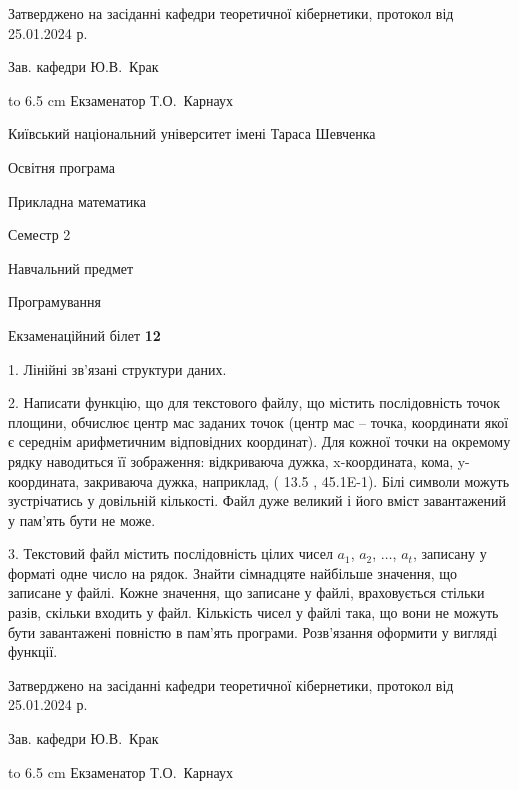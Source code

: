 \documentclass[12pt, ukrainian]{article}
\begin{document}
{\smallskip\smallskip \begin {scriptsize} Затверджено на засіданні кафедри теоретичної кібернетики, протокол   від   25.01.2024 р.\par\smallskip\smallskip\smallskip\smallskip
{\parbox {6.5 cm} {Зав. кафедри \dotfill Ю.В.~Крак}}\hspace {0.7cm} {\hbox to 6.5 cm { Екзаменатор \dotfill Т.О.~Карнаух}} \end{scriptsize}}
\vspace{0.9cm}
{{\begin {scriptsize}\par
{ \center  Київський національний університет імені Тараса Шевченка \par}
{\parbox {5 cm}{Освітня програма \hfill}{\parbox {7 cm}{Прикладна математика\hfill}}\parbox {6 cm}{\hfill Семестр 2}}\par
{\parbox {5 cm} {Навчальний предмет \hfill}\parbox {7 cm}{Програмування \hfill}\parbox {6cm}{\hfill}\par}\vspace{-15pt} \end{scriptsize}}{\center Екзаменаційний білет \No \textbf { 12 }\par}}
{%
1. Лінійні зв’язані структури даних.%
\par
2. Написати функцію, що для текстового файлу, що містить послідовність точок площини, обчислює центр мас заданих точок (центр мас -- точка, координати якої є середнім арифметичним відповідних координат). Для кожної точки на окремому рядку наводиться її зображення: відкриваюча дужка, x-координата, кома, y-координата, закриваюча дужка, наприклад, ( 13.5 , 45.1E-1). Білі символи можуть зустрічатись у довільній кількості. Файл дуже великий і його вміст завантажений у пам'ять бути не може.

\par
3. Текстовий файл містить послідовність цілих чисел $a_1$, $a_2$, $\ldots$, $a_t$, записану у форматі одне число на рядок. Знайти сімнадцяте найбільше значення, що записане у файлі. Кожне значення, що записане у файлі, враховується стільки разів, скільки входить у файл. Кількість чисел у файлі така, що вони не можуть бути завантажені повністю в пам'ять програми. Розв'язання оформити у вигляді функції.

}
{\smallskip\smallskip \begin {scriptsize} Затверджено на засіданні кафедри теоретичної кібернетики, протокол   від   25.01.2024 р.\par\smallskip\smallskip\smallskip\smallskip
{\parbox {6.5 cm} {Зав. кафедри \dotfill Ю.В.~Крак}}\hspace {0.7cm} {\hbox to 6.5 cm { Екзаменатор \dotfill Т.О.~Карнаух}} \end{scriptsize}}
\end{document}
